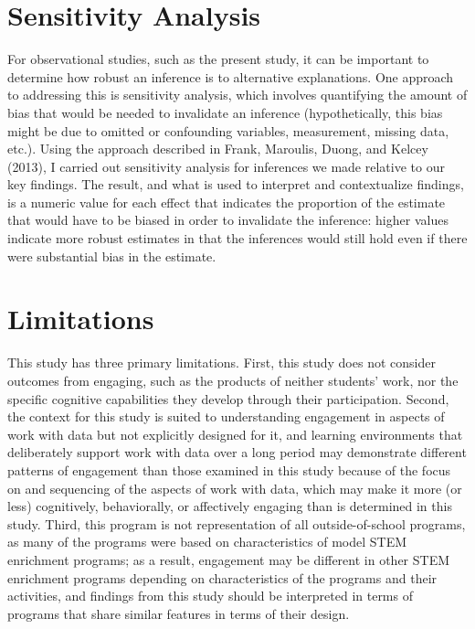 \documentclass[]{msu-thesis}
\theoremstyle{definition}
\theoremstyle{definition}
\theoremstyle{definition}
\theoremstyle{remark}
\begin{document}
\section{Sensitivity Analysis}\label{sensitivity-analysis}

For observational studies, such as the present study, it can be
important to determine how robust an inference is to alternative
explanations. One approach to addressing this is sensitivity analysis,
which involves quantifying the amount of bias that would be needed to
invalidate an inference (hypothetically, this bias might be due to
omitted or confounding variables, measurement, missing data, etc.).
Using the approach described in Frank, Maroulis, Duong, and Kelcey
(2013), I carried out sensitivity analysis for inferences we made
relative to our key findings. The result, and what is used to interpret
and contextualize findings, is a numeric value for each effect that
indicates the proportion of the estimate that would have to be biased in
order to invalidate the inference: higher values indicate more robust
estimates in that the inferences would still hold even if there were
substantial bias in the estimate.

\section{Limitations}\label{limitations}

This study has three primary limitations. First, this study does not
consider outcomes from engaging, such as the products of neither
students' work, nor the specific cognitive capabilities they develop
through their participation. Second, the context for this study is
suited to understanding engagement in aspects of work with data but not
explicitly designed for it, and learning environments that deliberately
support work with data over a long period may demonstrate different
patterns of engagement than those examined in this study because of the
focus on and sequencing of the aspects of work with data, which may make
it more (or less) cognitively, behaviorally, or affectively engaging
than is determined in this study. Third, this program is not
representation of all outside-of-school programs, as many of the
programs were based on characteristics of model STEM enrichment
programs; as a result, engagement may be different in other STEM
enrichment programs depending on characteristics of the programs and
their activities, and findings from this study should be interpreted in
terms of programs that share similar features in terms of their design.
\end{document}
